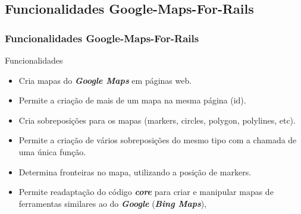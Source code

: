 \subsection{Funcionalidades Google-Maps-For-Rails}
\begin{frame}
 \frametitle{Funcionalidades Google-Maps-For-Rails}

  \begin{block}{Funcionalidades}   

   \begin{itemize}

    \item  Cria mapas do \emph{\textbf{Google Maps}} em páginas web.

    \item  Permite a criação de mais de um mapa na mesma página (id).

    \item  Cria sobreposições para os mapas (markers, circles, polygon, polylines, etc).

    \item  Permite a criação de vários sobreposições do mesmo tipo com a chamada de uma única função.

    \item  Determina fronteiras no mapa, utilizando a posição de markers.

    \item  Permite readaptação do código \emph{\textbf{core}} para criar e manipular mapas de ferramentas
    similares ao do \emph{\textbf{Google}} (\emph{\textbf{Bing Maps}}),

   \end{itemize}

  \end{block}

\end{frame}


